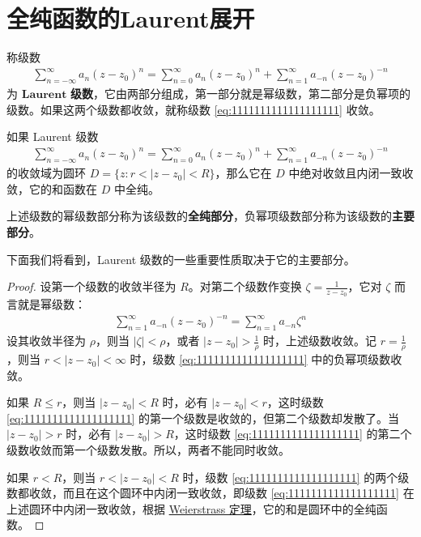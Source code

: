 \documentclass[../../main.tex]{subfiles}%
\begin{document}
\section{全纯函数的Laurent展开}

\begin{definition}
称级数
\begin{align}
\sum_{n = -\infty}^{\infty} a_n (z - z_0)^n = \sum_{n = 0}^{\infty} a_n (z - z_0)^n + \sum_{n = 1}^{\infty} a_{-n} (z - z_0)^{-n} \label{eq:1111111111111111111}
\end{align}
为 $\mathbf{Laurent}$ \textbf{级数}，它由两部分组成，第一部分就是幂级数，第二部分是负幂项的级数。如果这两个级数都收敛，就称级数 \eqref{eq:1111111111111111111} 收敛。
\end{definition}

\begin{theorem}\label{theorem:定理5.1.1}
如果 Laurent 级数
\begin{align*}
\sum_{n = -\infty}^{\infty} a_n (z - z_0)^n = \sum_{n = 0}^{\infty} a_n (z - z_0)^n + \sum_{n = 1}^{\infty} a_{-n} (z - z_0)^{-n}
\end{align*}
的收敛域为圆环 \( D = \{ z: r < |z - z_0| < R \} \)，那么它在 \( D \) 中绝对收敛且内闭一致收敛，它的和函数在 \( D \) 中全纯。

上述级数的幂级数部分称为该级数的\textbf{全纯部分}，负幂项级数部分称为该级数的\textbf{主要部分}。
\end{theorem}
\begin{remark}
下面我们将看到，Laurent 级数的一些重要性质取决于它的主要部分。
\end{remark}
\begin{proof}

设第一个级数的收敛半径为 \( R \)。对第二个级数作变换 \( \zeta = \frac{1}{z - z_0} \)，它对 \( \zeta \) 而言就是幂级数：
\begin{align*}
\sum_{n = 1}^{\infty} a_{-n} (z - z_0)^{-n} = \sum_{n = 1}^{\infty} a_{-n} \zeta^n
\end{align*}
设其收敛半径为 \( \rho \)，则当 \( |\zeta| < \rho \)，或者 \( |z - z_0| > \frac{1}{\rho} \) 时，上述级数收敛。记 \( r = \frac{1}{\rho} \)，则当 \( r < |z - z_0| < \infty \) 时，级数 \eqref{eq:1111111111111111111} 中的负幂项级数收敛。

如果 \( R \leqslant  r \)，则当 \( |z - z_0| < R \) 时，必有 \( |z - z_0| < r \)，这时级数 \eqref{eq:1111111111111111111} 的第一个级数是收敛的，但第二个级数却发散了。当 \( |z - z_0| > r \) 时，必有 \( |z - z_0| > R \)，这时级数 \eqref{eq:1111111111111111111} 的第二个级数收敛而第一个级数发散。所以，两者不能同时收敛。

如果 \( r < R \)，则当 \( r < |z - z_0| < R \) 时，级数 \eqref{eq:1111111111111111111} 的两个级数都收敛，而且在这个圆环中内闭一致收敛，即级数 \eqref{eq:1111111111111111111} 在上述圆环中内闭一致收敛，根据 \hyperref[theorem:Weierstrass定理]{Weierstrass 定理}，它的和是圆环中的全纯函数。

\end{proof}
\end{document}
